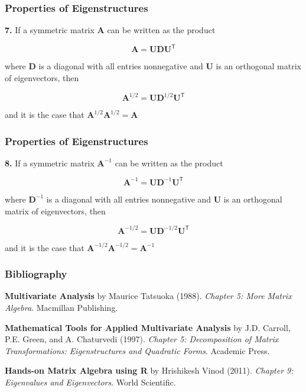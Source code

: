 \documentclass[12pt]{beamer}\usepackage[]{graphicx}\usepackage[]{color}
\begin{document}

\begin{frame}
\frametitle{Properties of Eigenstructures}

{\mdlit \textbf{7.}} If a symmetric matrix $\mathbf{A}$ can be written as the
product

$$
\mathbf{A = UDU^\mathsf{T}}
$$

where $\mathbf{D}$ is a diagonal with all entries nonnegative and $\mathbf{U}$
is an orthogonal matrix of eigenvectors, then 

$$
\mathbf{A}^{1/2} = \mathbf{UD}^{1/2} \mathbf{U}^\mathsf{T}
$$

and it is the case that $\mathbf{A}^{1/2} \mathbf{A}^{1/2} = \mathbf{A}$

\end{frame}


\begin{frame}
\frametitle{Properties of Eigenstructures}

{\mdlit \textbf{8.}} If a symmetric matrix $\mathbf{A}^{-1}$ can be written as the
product

$$
\mathbf{A}^{-1} = \mathbf{UD}^{-1} \mathbf{U}^\mathsf{T}
$$

where $\mathbf{D}^{-1}$ is a diagonal with all entries nonnegative and $\mathbf{U}$
is an orthogonal matrix of eigenvectors, then 

$$
\mathbf{A}^{-1/2} = \mathbf{UD}^{-1/2} \mathbf{U}^\mathsf{T}
$$

and it is the case that $\mathbf{A}^{-1/2} \mathbf{A}^{-1/2} = \mathbf{A}^{-1}$

\end{frame}


\begin{frame}
\frametitle{Bibliography}

{\footnotesize
\bi
  \item \textbf{Multivariate Analysis} by Maurice Tatsuoka (1988).
  \textit{Chapter 5: More Matrix Algebra}. Macmillan Publishing.
  \item \textbf{Mathematical Tools for Applied Multivariate Analysis} by J.D. Carroll, P.E. Green, and A. Chaturvedi (1997). 
  \textit{Chapter 5: Decomposition of Matrix Transformations: Eigenstructures and Quadratic Forms}. Academic Press. 
  \item \textbf{Hands-on Matrix Algebra using R} by Hrishikesh Vinod (2011).
  \textit{Chapter 9: Eigenvalues and Eigenvectors}. World Scientific.
\ei
}

\end{frame}

\end{document}
